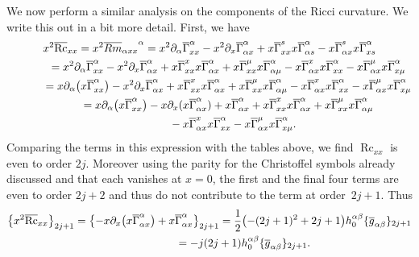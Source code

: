 \documentclass[pdftex]{sigma}
\numberwithin{equation}{section}
\newcommand{\olg}{\overline{g}}
\newcommand{\olGamma}{\overline{\Gamma}}
\DeclareMathOperator{\Rc}{Rc}
\begin{document}
We now perform a similar analysis on the components of the Ricci curvature. We write this out in a bit more detail. First, we have
\begin{gather*}
x^2 \overline{\Rc}_{xx} = x^2 {\overline{Rm}_{\alpha x x}}^{\alpha} = x^2 \partial_{\alpha} \olGamma_{xx}^{\alpha} - x^2 \partial_{x} \olGamma_{\alpha x}^{\alpha} + x\olGamma_{xx}^{s} x \olGamma_{\alpha s}^{\alpha} - x \olGamma_{\alpha x}^{s} x \olGamma_{x s}^{\alpha} \nonumber\\
\hphantom{x^2 \overline{\Rc}_{xx}}{} = x^2 \partial_{\alpha} \olGamma_{xx}^{\alpha} - x^2 \partial_{x} \olGamma_{\alpha x}^{\alpha} + x\olGamma_{xx}^{x} x\olGamma_{\alpha x}^{\alpha} + x\olGamma_{xx}^{\mu} x\olGamma_{\alpha \mu}^{\alpha} - x\olGamma_{\alpha x}^{x} x\olGamma_{x x}^{\alpha} - x\olGamma_{\alpha x}^{\mu} x\olGamma_{x \mu}^{\alpha}\nonumber\\
\hphantom{x^2 \overline{\Rc}_{xx}}{} = x \partial_{\alpha} \big(x \olGamma_{xx}^{\alpha}\big) - x^2 \partial_{x} \olGamma_{\alpha x}^{\alpha} + x\olGamma_{xx}^{x} x\olGamma_{\alpha x}^{\alpha} + x\olGamma_{xx}^{\mu} x\olGamma_{\alpha \mu}^{\alpha} - x\olGamma_{\alpha x}^{x} x\olGamma_{x x}^{\alpha}
 - x\olGamma_{\alpha x}^{\mu} x\olGamma_{x \mu}^{\alpha}\nonumber\\
\hphantom{x^2 \overline{\Rc}_{xx}}{} = x \partial_{\alpha} \big(x \olGamma_{xx}^{\alpha}\big) - x \partial_{x} (x \olGamma_{\alpha x}^{\alpha} ) + x \olGamma_{\alpha x}^{\alpha} + x\olGamma_{xx}^{x} x\olGamma_{\alpha x}^{\alpha} + x\olGamma_{xx}^{\mu} x\olGamma_{\alpha \mu}^{\alpha}\nonumber\\
\hphantom{x^2 \overline{\Rc}_{xx}=}{} - x\olGamma_{\alpha x}^{x} x\olGamma_{x x}^{\alpha} - x\olGamma_{\alpha x}^{\mu} x\olGamma_{x \mu}^{\alpha}.%
\end{gather*}
Comparing the terms in this expression with the tables above, we find $\Rc_{xx}$ is even to order $2j$. Moreover using the parity for the Christoffel symbols already discussed and that each vanishes at $x=0$, the first and the final four terms are even to order $2j+2$ and thus do not contribute to the term at order~$2j+1$. Thus
\begin{gather}
\big\{ x^2 \overline{\Rc}_{xx} \big\}_{2j+1} = \big\{{-} x \partial_{x} \big(x \olGamma_{\alpha x}^{\alpha}\big) + x \olGamma_{\alpha x}^{\alpha} \big\}_{2j+1}
= \frac{1}{2} \big( {-}(2j+1)^2 + 2j+1 \big) h_0^{\alpha \beta} \{ \olg_{\alpha \beta} \}_{2j+1} \nonumber\\
\hphantom{\big\{ x^2 \overline{\Rc}_{xx} \big\}_{2j+1}}{} = -j (2j+1) h_0^{\alpha \beta} \{ \olg_{\alpha \beta} \}_{2j+1}.\label{eqA.5}
\end{gather}
\end{document}
